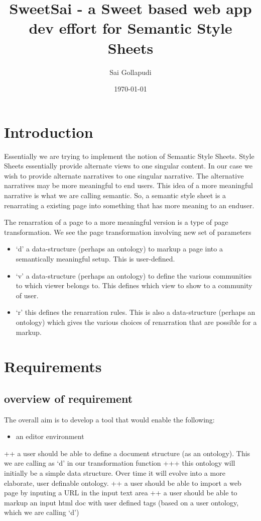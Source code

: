 \documentclass[11pt]{article}
\title{SweetSai - a Sweet based web app dev effort for Semantic Style Sheets}
\author{Sai Gollapudi}
\date{\today}
\begin{document}
\maketitle

\setcounter{tocdepth}{3}
\tableofcontents
\vspace*{1cm}

\section{Introduction}
\label{sec-1}

Essentially we are trying to implement the notion of Semantic Style
Sheets. Style Sheets essentially provide alternate views to one
singular content. In our case we wish to provide alternate narratives
to one singular narrative. The alternative narratives may be more
meaningful to end users. This idea of a more meaningful narrative is
what we are calling semantic. So, a semantic style sheet is a
renarrating a existing page into something that has more meaning to an
enduser.

The renarration of a page to a more meaningful version is a type of
page transformation. We see the page transformation involving new set
of parameters
\begin{itemize}
\item `d' a data-structure (perhaps an ontology) to markup a page into a
  semantically meaningful setup. This is user-defined.
\item `v' a data-structure (perhaps an ontology) to define the various
  communities to which viewer belongs to. This defines which view to
  show to a community of user.
\item `r' this defines the renarration rules. This is also a
  data-structure (perhaps an ontology) which gives the various choices
  of renarration that are possible for a markup.
\end{itemize}
\section{Requirements}
\label{sec-2}
\subsection{overview of requirement}
\label{sec-2-1}

The overall aim is to develop a tool that would enable the following:
\begin{itemize}
\item an editor environment
\end{itemize}
++ a user should be able to define a document structure (as an
 ontology). This we are calling as `d' in our transformation function
+++ this ontology will initially be a simple data structure. Over time
 it will evolve into a more elaborate, user definable ontology.
++ a user should be able to import a web page by inputing a URL in the
 input text area
++ a user should be able to markup an input html doc with user defined tags (based on a user ontology, which we
  are calling `d') 
\end{document}
